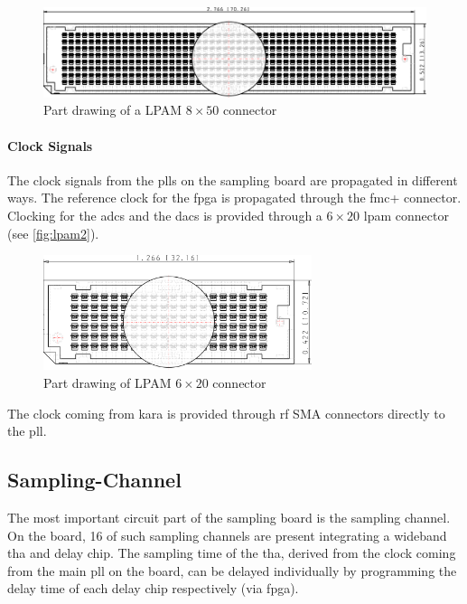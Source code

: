 \begin{figure}[tbh]
	\centering
	\includegraphics[width = \textwidth]{chap/04-work/img/lpam_50_top.pdf}
	\caption[LPAM $8\times50$ connector]{Part drawing of a LPAM $8\times50$ connector}
	\label{fig:lpam1}
\end{figure}


\paragraph{Clock Signals}
The clock signals from the \glspl{pll} on the sampling board are propagated in different ways.
The reference clock for the \gls{fpga} is propagated through the \gls{fmc}+ connector.
Clocking for the \glspl{adc} and the \glspl{dac} is provided through a $6\times20$ \gls{lpam} connector (see \autoref{fig:lpam2}).
\begin{figure}[tbh]
	\centering
	\includegraphics[width = 0.7\textwidth]{chap/04-work/img/lpam_20.pdf}
	\caption[LPAM $6\times20$ connector]{Part drawing of LPAM $6\times20$ connector}
	\label{fig:lpam2}
\end{figure}

The clock coming from \gls{kara} is provided through \gls{rf} SMA connectors directly to the \gls{pll}.

\subsection{Sampling-Channel}
The most important circuit part of the sampling board is the sampling channel. 
On the board, 16 of such sampling channels are present integrating a wideband \gls{tha} and delay chip.
The sampling time of the \gls{tha}, derived from the clock coming from the main \gls{pll} on the board, can be delayed individually by programming the delay time of each delay chip respectively (via \gls{fpga}). 

